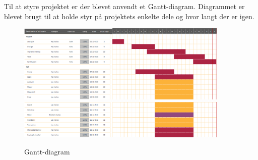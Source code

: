 Til at styre projektet er der blevet anvendt et Gantt-diagram. Diagrammet er blevet brugt til at holde styr på projektets enkelte dele og hvor langt der er igen.
\begin{figure}[h]
    \centering
    \includegraphics[width=0.9\textwidth]{sources/gant1.PNG}
    \includegraphics[width=0.9\textwidth]{sources/gant2.PNG}
    \caption{Gantt-diagram}
    \label{fig:gantt}
\end{figure}